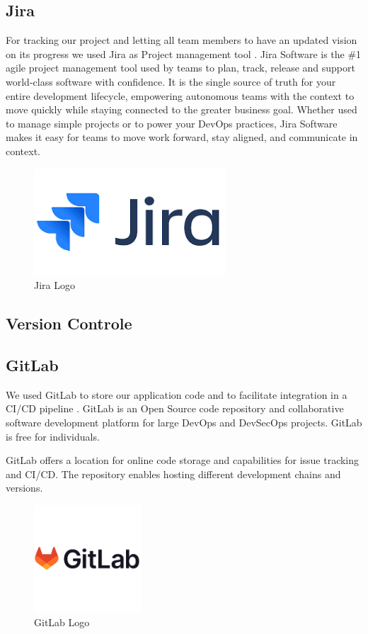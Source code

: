 \subsection*{Jira}
For tracking our project and letting all team members to  have an updated vision on its progress we used Jira as Project management tool .
Jira Software is the \#1 agile project management tool used by teams to plan, track, release and support world-class software with confidence. It is the single source of truth for your entire development lifecycle, empowering autonomous teams with the context to move quickly while staying connected to the greater business goal. Whether used to manage simple projects or to power your DevOps practices, Jira Software makes it easy for teams to move work forward, stay aligned, and communicate in context.\cite{Jira}
\begin{figure}[H]
    \centering
    \includegraphics[height=4cm]{images/chap1/jira.png}
    \caption{Jira Logo}
    \label{fig:enter-label}
\end{figure}
\subsection{Version Controle}
\subsection*{GitLab}
We used GitLab to store our application code and to facilitate integration in a CI/CD pipeline .
GitLab is an Open Source code repository and collaborative software development platform for large DevOps and DevSecOps projects. GitLab is free for individuals.

GitLab offers a location for online code storage and capabilities for issue tracking and CI/CD. The repository enables hosting different development chains and versions.\cite{GitLab}
\begin{figure}[H]
    \centering
    \includegraphics[height=4cm]{images/chap1/gitlab.png}
    \caption{GitLab Logo}
    \label{fig:enter-label}
\end{figure}

